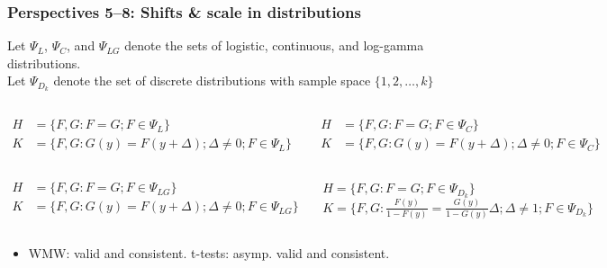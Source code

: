 \begin{frame}\frametitle{Perspectives 5--8: Shifts \& scale in distributions}
	\small
	Let $\Psi_L$, $\Psi_C$, and $\Psi_{LG}$ denote the sets of \alert{logistic}, \alert{continuous}, and \alert{log-gamma} distributions. \\
	Let $\Psi_{D_k}$ denote the set of discrete distributions with sample space $\{1,2,\dots,k\}$
	\begin{columns}
		\begin{per}
	\vspace{-1.5em}
	\small
	\begin{align*}
		H&=\{F,G: F=G; F \in \Psi_L \}\\
		K&=\{F,G: G(y)=F(y+\Delta); \Delta\neq0; F \in \Psi_L\}
	\end{align*}
\end{per}
\begin{per}
	\vspace{-1.5em}
	\small
	\begin{align*}
		H&=\{F,G: F=G; F \in \Psi_C \}\\
		K&=\{F,G: G(y)=F(y+\Delta); \Delta\neq0; F \in \Psi_C\}
	\end{align*}
\end{per}
	\end{columns}
		\begin{columns}[t]
		\column{0.475\linewidth}
		\begin{per}
			\vspace{-1.5em}
			\small
			\begin{align*}
				H&=\{F,G: F=G; F \in \Psi_{LG} \}\\
				K&=\{F,G: G(y)=F(y+\Delta); \Delta\neq0; F \in \Psi_{LG}\}
			\end{align*}
		\end{per}
		\column{0.475\linewidth}
		\begin{per}
			\vspace{0.5em}
			\small
			$H=\{F,G: F=G; F \in \Psi_{D_k} \}$\\
			\footnotesize
			$K=\{F,G: \frac{F(y)}{1-F(y)}=\frac{G(y)}{1-G(y)}\Delta;\Delta\neq1; F \in \Psi_{D_k}\}$
		\end{per}
	\end{columns}
\begin{itemize}
\item WMW: valid and consistent. t-tests: asymp. valid and consistent.
\end{itemize}
\end{frame}


